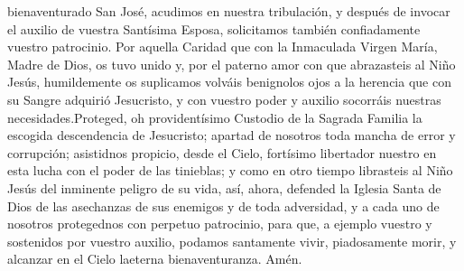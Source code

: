 bienaventurado San José, acudimos en nuestra tribulación, y después de invocar el auxilio de vuestra Santísima Esposa, solicitamos
también confiadamente vuestro patrocinio. Por aquella Caridad que con la Inmaculada Virgen María, Madre de Dios, os tuvo unido y, por el paterno amor 
con que abrazasteis al Niño Jesús, humildemente os suplicamos volváis benignolos ojos a la herencia que con su Sangre adquirió Jesucristo, y con vuestro 
poder y auxilio socorráis nuestras necesidades.Proteged, oh providentísimo Custodio de la Sagrada Familia la escogida descendencia de Jesucristo; 
apartad de nosotros toda mancha de error y corrupción; asistidnos propicio, desde el Cielo, fortísimo libertador nuestro en esta lucha con el poder de
las tinieblas; y como en otro tiempo librasteis al Niño Jesús del inminente peligro de su vida, así, ahora, defended la Iglesia Santa de Dios de las 
asechanzas de sus enemigos y de toda adversidad, y a cada uno de nosotros protegednos con perpetuo patrocinio, para que, a ejemplo vuestro y sostenidos 
por vuestro auxilio, podamos santamente vivir, piadosamente morir, y alcanzar en el Cielo laeterna bienaventuranza. Amén.